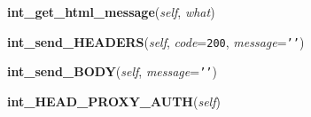     \vspace{0.5ex}

\hspace{.8\funcindent}\begin{boxedminipage}{\funcwidth}

    \raggedright \textbf{int\_get\_html\_message}(\textit{self}, \textit{what})

\setlength{\parskip}{2ex}
\setlength{\parskip}{1ex}
    \end{boxedminipage}

    \label{Proxy:Proxy:int_send_HEADERS}

    \vspace{0.5ex}

\hspace{.8\funcindent}\begin{boxedminipage}{\funcwidth}

    \raggedright \textbf{int\_send\_HEADERS}(\textit{self}, \textit{code}={\tt 200}, \textit{message}={\tt \texttt{'}\texttt{}\texttt{'}})

\setlength{\parskip}{2ex}
\setlength{\parskip}{1ex}
    \end{boxedminipage}

    \label{Proxy:Proxy:int_send_BODY}

    \vspace{0.5ex}

\hspace{.8\funcindent}\begin{boxedminipage}{\funcwidth}

    \raggedright \textbf{int\_send\_BODY}(\textit{self}, \textit{message}={\tt \texttt{'}\texttt{}\texttt{'}})

\setlength{\parskip}{2ex}
\setlength{\parskip}{1ex}
    \end{boxedminipage}

    \label{Proxy:Proxy:int_HEAD_PROXY_AUTH}

    \vspace{0.5ex}

\hspace{.8\funcindent}\begin{boxedminipage}{\funcwidth}

    \raggedright \textbf{int\_HEAD\_PROXY\_AUTH}(\textit{self})

\setlength{\parskip}{2ex}
\setlength{\parskip}{1ex}
    \end{boxedminipage}

